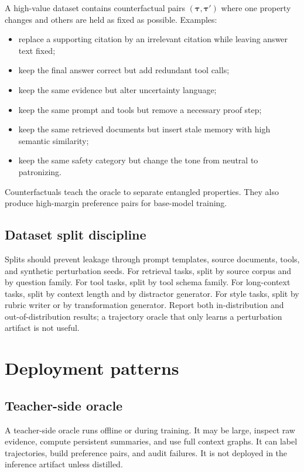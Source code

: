 \documentclass[11pt]{article}
\theoremstyle{definition}
\theoremstyle{remark}
\newcommand{\traj}{\boldsymbol{\tau}}
\numberwithin{equation}{section}
\begin{document}
A high-value dataset contains counterfactual pairs \((\traj,\traj')\) where one property changes and others are held as fixed as possible.  Examples:
\begin{itemize}
    \item replace a supporting citation by an irrelevant citation while leaving answer text fixed;
    \item keep the final answer correct but add redundant tool calls;
    \item keep the same evidence but alter uncertainty language;
    \item keep the same prompt and tools but remove a necessary proof step;
    \item keep the same retrieved documents but insert stale memory with high semantic similarity;
    \item keep the same safety category but change the tone from neutral to patronizing.
\end{itemize}
Counterfactuals teach the oracle to separate entangled properties.  They also produce high-margin preference pairs for base-model training.

\subsection{Dataset split discipline}

Splits should prevent leakage through prompt templates, source documents, tools, and synthetic perturbation seeds.  For retrieval tasks, split by source corpus and by question family.  For tool tasks, split by tool schema family.  For long-context tasks, split by context length and by distractor generator.  For style tasks, split by rubric writer or by transformation generator.  Report both in-distribution and out-of-distribution results; a trajectory oracle that only learns a perturbation artifact is not useful.

\section{Deployment patterns}

\subsection{Teacher-side oracle}
A teacher-side oracle runs offline or during training.  It may be large, inspect raw evidence, compute persistent summaries, and use full context graphs.  It can label trajectories, build preference pairs, and audit failures.  It is not deployed in the inference artifact unless distilled.
\end{document}

